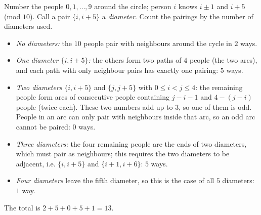 Number the people $0,1,\dots,9$ around the circle; person $i$ knows $i\pm1$ and $i+5$ (mod $10$). Call a pair $\{i,i+5\}$ a \emph{diameter}. Count the pairings by the number of diameters used.
\begin{itemize}
\item \emph{No diameters:} the $10$ people pair with neighbours around the cycle in $2$ ways.
\item \emph{One diameter $\{i,i+5\}$:} the others form two paths of $4$ people (the two arcs), and each path with only neighbour pairs has exactly one pairing: $5$ ways.
\item \emph{Two diameters} $\{i,i+5\}$ and $\{j,j+5\}$ with $0\le i<j\le4$: the remaining people form arcs of consecutive people containing $j-i-1$ and $4-(j-i)$ people (twice each). These two numbers add up to $3$, so one of them is odd. People in an arc can only pair with neighbours inside that arc, so an odd arc cannot be paired: $0$ ways.
\item \emph{Three diameters:} the four remaining people are the ends of two diameters, which must pair as neighbours; this requires the two diameters to be adjacent, i.e. $\{i,i+5\}$ and $\{i+1,i+6\}$: $5$ ways.
\item \emph{Four diameters} leave the fifth diameter, so this is the case of all $5$ diameters: $1$ way.
\end{itemize}
The total is $2+5+0+5+1=\boxed{13}$.
